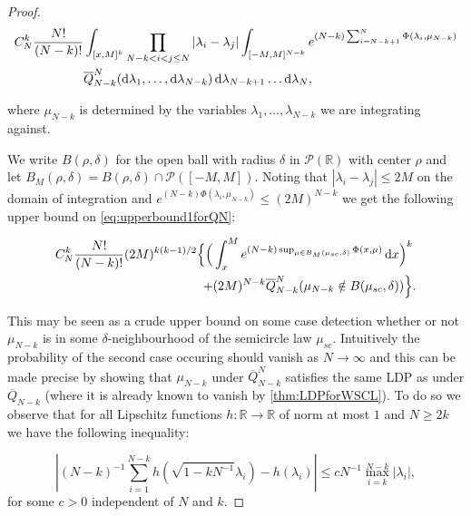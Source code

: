 \begin{proof}
	\begin{align}\label{eq:upperbound1forQN}
		C_N^k\frac{N!}{(N-k)!}&\int_{[x,M]^k}\prod_{N-k<i<j\leq N}|\lambda_i-\lambda_j| \int_{[-M,M]^{N-k}}e^{(N-k)\sum_{i=N-k+1}^N\Phi(\lambda_i,\mu_{N-k})}\nonumber\\
		&\overline Q_{N-k}^N(\mathop{}\!\mathrm{d}\lambda_1,\dots,\mathop{}\!\mathrm{d}\lambda_{N-k})\mathop{}\!\mathrm{d}\lambda_{N-k+1}\dots\mathop{}\!\mathrm{d}\lambda_N,
	\end{align}
	
	where $\mu_{N-k}$ is determined by the variables $\lambda_1,\dots,\lambda_{N-k}$ we are integrating against.
	
	We write $B(\rho,\delta)$ for the open ball with radius $\delta$ in $\mathcal P(\mathbb R)$ with center $\rho$ and let $B_M(\rho,\delta)=B(\rho,\delta)\cap\mathcal P([-M,M])$. Noting that $|\lambda_i-\lambda_j|\leq 2M$ on the domain of integration and $e^{(N-k)\Phi(\lambda_i,\mu_{N-k})}\leq (2M)^{N-k}$ we get the following upper bound on \ref{eq:upperbound1forQN}:
	
	\begin{align}\label{eq:upperbound2forQN}
		C_N^k\frac{N!}{(N-k)!}(2M)^{k(k-1)/2}\Big\{
			\Big(
				&\int_x^M e^{(N-k)\sup_{\mu\in B_M(\mu_{sc},\delta)}\Phi(x,\mu)}\mathop{}\!\mathrm{d} x
			\Big)^k \nonumber\\
			+&(2M)^{N-k}\overline Q_{N-k}^N(\mu_{N-k}\notin B(\mu_{sc},\delta))
		\Big\}.
	\end{align}
	
	This may be seen as a crude upper bound on some case detection whether or not $\mu_{N-k}$ is in some $\delta$-neighbourhood of the semicircle law $\mu_{sc}$. Intuitively the probability of the second case occuring should vanish as $N\rightarrow\infty$ and this can be made precise by showing that $\mu_{N-k}$ under $\overline Q_{N-k}^N$ satisfies the same LDP as under $\overline Q_{N-k}$ (where it is already known to vanish by \ref{thm:LDPforWSCL}). To do so we observe that for all Lipschitz functions $h:\mathbb R \rightarrow\mathbb R$ of norm at most $1$ and $N\geq 2k$ we have the following inequality:
	
	$$
	\left|(N-k)^{-1}\sum_{i=1}^{N-k}h\left(\sqrt{1-kN^{-1}}\lambda_i\right)-h(\lambda_i)\right|\leq cN^{-1}\max_{i=k}^{N-k}|\lambda_i|,
	$$
	for some $c>0$ independent of $N$ and $k$. 
	

\end{proof}
